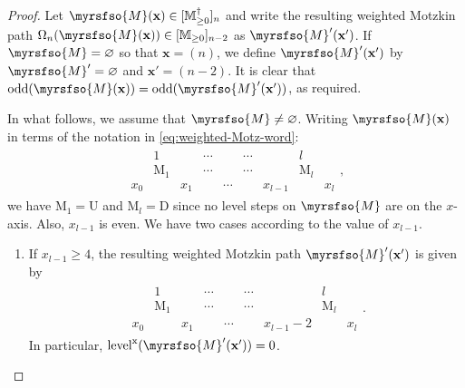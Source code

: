 \documentclass[12pt,reqno]{amsart}
\numberwithin{equation}{section}
\theoremstyle{theorem}
\theoremstyle{definition}
\theoremstyle{named}
\newcommand{\odd}{\operatorname{odd}}
\newcommand{\level}{\operatorname{level}}
\newcommand{\x}{\operatorname{x}}
\newcommand{\cM}{\myrsfso{M}}
\newcommand{\bbM}{\mathbb{M}}
\newcommand{\bfx}{\mathbf{x}}
\newcommand{\rmM}{\mathrm{M}}
\newcommand{\rU}{\mathrm{U}}
\newcommand{\rD}{\mathrm{D}}
\begin{document}
\begin{proof}
	Let $\cM(\bfx)\in [\bbM_{\ge 0}^\dagger]_n$ and write the resulting weighted Motzkin path $\Omega_n(\cM(\bfx)) \in [\bbM_{\ge 0}]_{n-2}$ as $\cM'(\bfx')$. If $\cM = \varnothing$ so that $\bfx=(n)$, we define $\cM'(\bfx')$ by $\cM' = \varnothing$ and $\bfx' = (n-2)$. It is clear that $\odd(\cM(\bfx)) = \odd(\cM'(\bfx'))$, as required.
	
	In what follows, we assume that $\cM \ne \varnothing$. Writing $\cM(\bfx)$ in terms of the notation in \eqref{eq:weighted-Motz-word}:
	\begin{align*}
		\begin{array}{ccccccccc}
			& 1 & & \cdots & & \cdots & & l\\
			& \rmM_1 & & \cdots & & \cdots & & \rmM_l\\
			x_0 & & x_1 & & \cdots & & x_{l-1} & & x_l
		\end{array},
	\end{align*}
	we have $\rmM_1 = \rU$ and $\rmM_l = \rD$ since no level steps on $\cM$ are on the $x$-axis. Also, $x_{l-1}$ is even. We have two cases according to the value of $x_{l-1}$.
	
	\begin{enumerate}[label={\textup{(\arabic{*})}}, leftmargin=*, labelsep=5pt, align=left, itemsep=2pt, topsep=2pt, parsep=2pt]
		\item If $x_{l-1}\ge 4$, the resulting weighted Motzkin path $\cM'(\bfx')$ is given by
		\begin{align*}
			\begin{array}{ccccccccc}
				& 1 & & \cdots & & \cdots & & l\\
				& \rmM_1 & & \cdots & & \cdots & & \rmM_l\\
				x_0 & & x_1 & & \cdots & & x_{l-1}-2 & & x_l
			\end{array}.
		\end{align*}
		In particular, $\level^{\x}(\cM'(\bfx')) = 0$.
		

\end{enumerate}
\end{proof}
\end{document}
